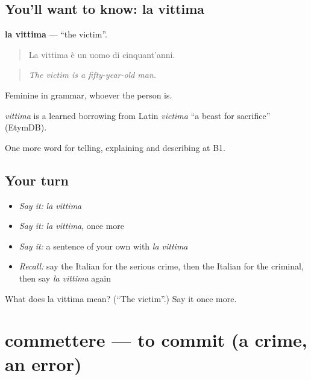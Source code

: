 \subsection*{You'll want to know: la vittima}
\textbf{la vittima} — \textquotedblleft{}the victim\textquotedblright{}.

\begin{quote}
La vittima è un uomo di cinquant'anni.
\end{quote}

\begin{quote}
\emph{The victim is a fifty-year-old man.}
\end{quote}

Feminine in grammar, whoever the person is.

\begin{cousinweb}
\emph{vittima} is a learned borrowing from Latin \emph{victima} \textquotedblleft{}a beast for sacrifice\textquotedblright{} (EtymDB).
\end{cousinweb}

\begin{grammarlens}[title={What you've built}]
One more word for telling, explaining and describing at B1.
\end{grammarlens}

\subsection*{Your turn}
\begin{itemize}
\raggedright
  \item \emph{Say it:} \emph{la vittima}
  \item \emph{Say it:} \emph{la vittima}, once more
  \item \emph{Say it:} a sentence of your own with \emph{la vittima}
  \item \emph{Recall:} say the Italian for the serious crime, then the Italian for the criminal, then say \emph{la vittima} again
\end{itemize}

\begin{tcolorbox}[breakable,colback=teal!4,colframe=teal!35!black,title={Before you move on}]
What does la vittima mean? (\textquotedblleft{}The victim\textquotedblright{}.) Say it once more.
\end{tcolorbox}
\section[commettere]{commettere — to commit (a crime, an error)}

